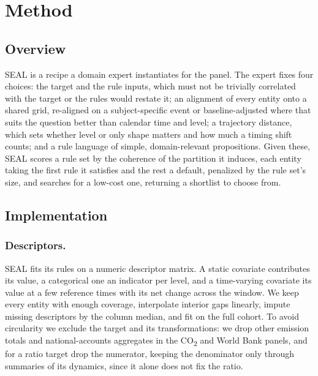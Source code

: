 \documentclass[runningheads]{llncs}
\begin{document}
\section{Method}
\label{sec:method}
\subsection{Overview}

\textsc{SEAL} is a recipe a domain expert instantiates for the panel. The expert fixes four choices: the target and the rule inputs, which must not be trivially correlated with the target or the rules would restate it; an alignment of every entity onto a shared grid, re-aligned on a subject-specific event or baseline-adjusted where that suits the question better than calendar time and level; a trajectory distance, which sets whether level or only shape matters and how much a timing shift counts; and a rule language of simple, domain-relevant propositions. Given these, \textsc{SEAL} scores a rule set by the coherence of the partition it induces, each entity taking the first rule it satisfies and the rest a default, penalized by the rule set's size, and searches for a low-cost one, returning a shortlist to choose from.

\subsection{Implementation}

\subsubsection{Descriptors.}
\textsc{SEAL} fits its rules on a numeric descriptor matrix. A static covariate contributes its value, a categorical one an indicator per level, and a time-varying covariate its value at a few reference times with its net change across the window. We keep every entity with enough coverage, interpolate interior gaps linearly, impute missing descriptors by the column median, and fit on the full cohort. To avoid circularity we exclude the target and its transformations: we drop other emission totals and national-accounts aggregates in the CO\textsubscript{2} and World Bank panels, and for a ratio target drop the numerator, keeping the denominator only through summaries of its dynamics, since it alone does not fix the ratio.
\end{document}
